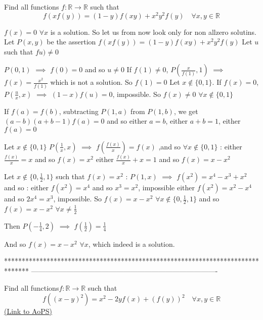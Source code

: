 \begin{solution}
	\begin{tcolorbox}Find all functions $f:\mathbb R\to\mathbb R$ such that
\[f(xf(y))=(1-y)f(xy)+x^{2}y^{2}f(y) \quad \forall x,y\in\mathbb R\]\end{tcolorbox}
$\boxed{f(x)=0}$ $\forall x$ is a solution. So let us from now look only for non allzero solutins.
Let $P(x,y)$ be the assertion $f(xf(y))=(1-y)f(xy)+x^2y^2f(y)$
Let $u$ such that $fu)\ne 0$

$P(0,1)$ $\implies$ $f(0)=0$ and so $u\ne 0$
If $f(1)\ne 0$, $P(\frac x{f(1)},1)$ $\implies$ $f(x)=\frac{x^2}{f(1)}$ which is not a solution. So $f(1)=0$
Let $x\notin \{0,1\}$. If $f(x)=0$, $P(\frac ux,x)$ $\implies$ $(1-x)f(u)=0$, impossible. So $f(x)\ne 0$ $\forall x\notin\{0,1\}$

If $f(a)=f(b)$, subtracting $P(1,a)$ from $P(1,b)$, we get $(a-b)(a+b-1)f(a)=0$ and so either $a=b$, either $a+b=1$, either $f(a)=0$

Let $x\notin\{0,1\}$ $P(\frac 1x,x)$ $\implies$ $f(\frac{f(x)}x)=f(x)$ ,and so $\forall x\notin\{0,1\}$ :
either $\frac{f(x)}x=x$ and so $f(x)=x^2$
either $\frac{f(x)}x+x=1$ and so $f(x)=x-x^2$

Let $x\notin\{0,\frac 12,1\}$ such that $f(x)=x^2$ : $P(1,x)$ $\implies$ $f(x^2)=x^4-x^3+x^2$ and so :
either $f(x^2)=x^4$ and so $x^3=x^2$, impossible
either $f(x^2)=x^2-x^4$ and so $2x^4=x^3$, impossible.
So $f(x)=x-x^2$ $\forall x\notin \{0,\frac 12,1\}$ and so $f(x)=x-x^2$ $\forall x\ne \frac 12$

Then $P(-\frac 14,2)$ $\implies$ $f(\frac 12)=\frac 14$

And so $\boxed{f(x)=x-x^2}$ $\forall x$, which indeed is a solution.
\end{solution}
*******************************************************************************
-------------------------------------------------------------------------------

\begin{problem}
	Find all functions$ f:\mathbb R\to\mathbb R$ such that
\[f((x - y)^2) = x^2 - 2yf(x) + (f(y))^2 \quad \forall x,y\in\mathbb R\]
	\flushright \href{https://artofproblemsolving.com/community/c6h566444}{(Link to AoPS)}
\end{problem}



